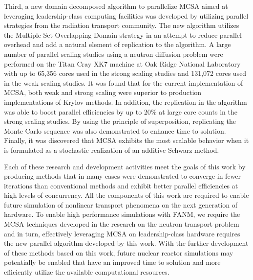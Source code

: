 Third, a new domain decomposed algorithm to parallelize MCSA aimed at
leveraging leadership-class computing facilities was developed by
utilizing parallel strategies from the radiation transport
community. The new algorithm utilizes the Multiple-Set
Overlapping-Domain strategy in an attempt to reduce parallel overhead
and add a natural element of replication to the algorithm. A large
number of parallel scaling studies using a neutron diffusion problem
were performed on the Titan Cray XK7 machine at Oak Ridge National
Laboratory with up to 65,356 cores used in the strong scaling studies
and 131,072 cores used in the weak scaling studies. It was found that
for the current implementation of MCSA, both weak and strong scaling
were superior to production implementations of Krylov methods. In
addition, the replication in the algorithm was able to boost parallel
efficiencies by up to 20\% at large core counts in the strong scaling
studies. By using the principle of superposition, replicating the
Monte Carlo sequence was also demonstrated to enhance time to
solution. Finally, it was discovered that MCSA exhibits the most
scalable behavior when it is formulated as a stochastic realization of
an additive Schwarz method.

Each of these research and development activities meet the goals of
this work by producing methods that in many cases were demonstrated to
converge in fewer iterations than conventional methods and exhibit
better parallel efficiencies at high levels of concurrency. All the
components of this work are required to enable future simulation of
nonlinear transport phenomena on the next generation of hardware. To
enable high performance simulations with FANM, we require the MCSA
techniques developed in the research on the neutron transport problem
and in turn, effectively leveraging MCSA on leadership-class hardware
requires the new parallel algorithm developed by this work. With the
further development of these methods based on this work, future
nuclear reactor simulations may potentially be enabled that have an
improved time to solution and more efficiently utilize the available
computational resources.
